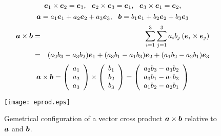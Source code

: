 \documentclass[10pt,a4j]{article}
\begin{document}
\begin{equation}
	\fat{e}_1 \times  \fat{e}_2=\fat{e}_3, \ \ 
	\fat{e}_2 \times  \fat{e}_3=\fat{e}_1, \ \ 
	\fat{e}_3 \times  \fat{e}_1=\fat{e}_2,
	\label{eqn:}
\end{equation}
\begin{equation}
	\fat{a}=
	a_1\fat{e}_1 + a_2\fat{e}_2 + a_3\fat{e}_3, \ \ 
	\fat{b}=
	b_1\fat{e}_1 + b_2\fat{e}_2 + b_3\fat{e}_3
	\label{eqn:}
\end{equation}
\begin{eqnarray}
	\mbox{\boldmath $a$}\times \mbox{\boldmath $b$} &= &
	\sum_{i=1}^3
	\sum_{j=1}^3
	a_ib_j \left(\mbox{\boldmath $e$}_i\times \mbox{\boldmath $e$}_j\right) \\
	&=&
	(a_2b_3-a_3b_2)\mbox{\boldmath $e$}_1
	+
	(a_3b_1-a_1b_3)\mbox{\boldmath $e$}_2
	+
	(a_1b_2-a_2b_1)\mbox{\boldmath $e$}_3
\end{eqnarray}
\begin{equation}
	\mbox{\boldmath $a$}\times \mbox{\boldmath $b$}
	=
	\left(
		\begin{array}{c}
			a_1 \\
			a_2 \\ 
			a_3 
		\end{array}
	\right)
	\times
	\left(
		\begin{array}{c}
			b_1 \\
			b_2 \\ 
			b_3 
		\end{array}
	\right)
	=
	\left(
		\begin{array}{c}
			a_2b_3-a_3b_2 \\

			a_3b_1-a_1b_3 \\ 
			a_1b_2-a_2b_1
		\end{array}
	\right)
	\label{eqn:}
\end{equation}
\begin{figure}[h]
	\begin{center}
	\texttt{[image: eprod.eps]} 
	\end{center}
	\caption{Gemetrical configuration of a vector cross product 
	$\mbox{\boldmath $a$}\times\mbox{\boldmath $b$}$ relative to $\mbox{\boldmath $a$}$ and $\mbox{\boldmath $b$}$.} 
	\label{fig:fig1_6}
\end{figure}
\end{document}

